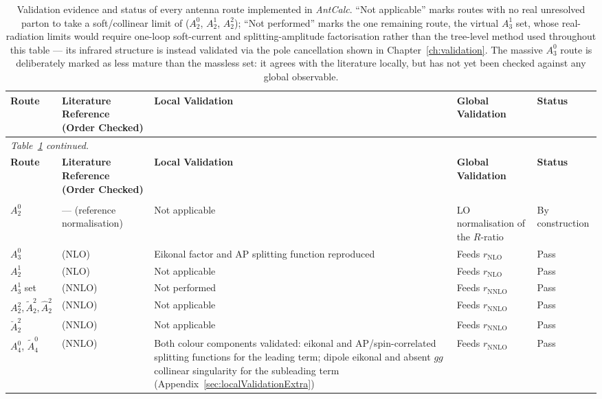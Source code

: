 \begin{center}
\begin{longtable}{|p{1.9cm}|p{2.8cm}|p{3.2cm}|p{2.4cm}|p{3.3cm}|}
\hline
\textbf{Route} & \textbf{Literature Reference (Order Checked)} & \textbf{Local Validation} & \textbf{Global Validation} & \textbf{Status} \\
\hline
\endfirsthead
\multicolumn{5}{l}{\textit{Table~\ref{tab:masterValidationStatus} continued.}}\\
\hline
\textbf{Route} & \textbf{Literature Reference (Order Checked)} & \textbf{Local Validation} & \textbf{Global Validation} & \textbf{Status} \\
\hline
\endhead
\hline
\caption{Validation evidence and status of every antenna route implemented in \textit{AntCalc}. ``Not applicable'' marks routes with no real unresolved parton to take a soft/collinear limit of ($A_2^0$, $A_2^1$, $A_2^2$); ``Not performed'' marks the one remaining route, the virtual $A_3^1$ set, whose real-radiation limits would require one-loop soft-current and splitting-amplitude factorisation rather than the tree-level method used throughout this table --- its infrared structure is instead validated via the pole cancellation shown in Chapter~\ref{ch:validation}. The massive $A_3^0$ route is deliberately marked as less mature than the massless set: it agrees with the literature locally, but has not yet been checked against any global observable.}
\label{tab:masterValidationStatus}\\
\endlastfoot
$A_2^0$ & --- (reference normalisation) & Not applicable & LO normalisation of the $R$-ratio & By construction \\ \hline
$A_3^0$ & \cite{Gehrmann-DeRidder:2005btv} (NLO) & Eikonal factor and AP splitting function reproduced & Feeds $r_\text{NLO}$ & Pass \\ \hline
$A_2^1$ & \cite{Gehrmann-DeRidder:2005btv} (NLO) & Not applicable & Feeds $r_\text{NLO}$ & Pass \\ \hline
$A_3^1$ set & \cite{Gehrmann-DeRidder:2005btv,Gehrmann-DeRidder:2004ttg} (NNLO) & Not performed & Feeds $r_\text{NNLO}$ & Pass \\ \hline
$A_2^2, \tilde A_2^2, \hat A_2^2$ & \cite{Gehrmann-DeRidder:2004ttg} (NNLO) & Not applicable & Feeds $r_\text{NNLO}$ & Pass \\ \hline
$\breve A_2^2$ & \cite{Jakubcik:2022zdi} (NNLO) & Not applicable & Feeds $r_\text{NNLO}$ & Pass \\ \hline
$A_4^0$, $\tilde A_4^0$ & \cite{Gehrmann-DeRidder:2005btv} (NNLO) & Both colour components validated: eikonal and AP/spin-correlated splitting functions for the leading term; dipole eikonal and absent $gg$ collinear singularity for the subleading term (Appendix~\ref{sec:localValidationExtra}) & Feeds $r_\text{NNLO}$ & Pass \\ \hline

\end{longtable}
\end{center}
